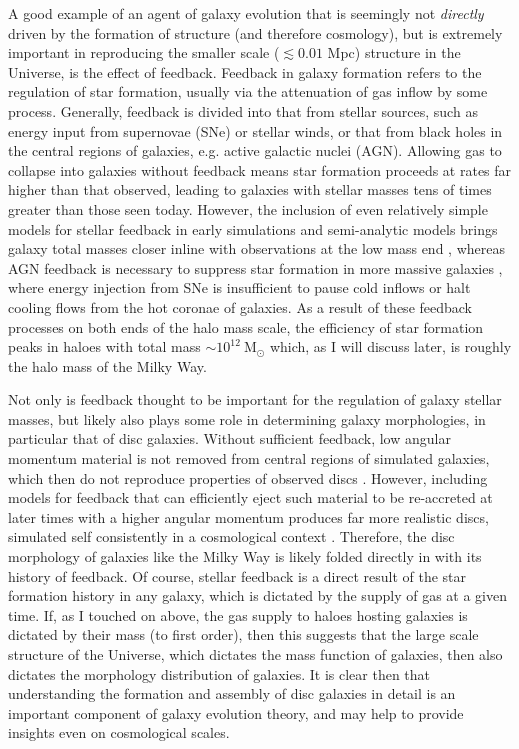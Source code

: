A good example of an agent of galaxy evolution that is seemingly not \emph{directly} driven by the formation of structure (and therefore cosmology), but is extremely important in reproducing the smaller scale ($\lesssim 0.01$ Mpc) structure in the Universe, is the effect of feedback. Feedback in galaxy formation refers to the regulation of star formation, usually via the attenuation of gas inflow by some process. Generally, feedback is divided into that from stellar sources, such as energy input from supernovae (SNe) or stellar winds, or that from black holes in the central regions of galaxies, e.g. active galactic nuclei (AGN). Allowing gas to collapse into galaxies without feedback means star formation proceeds at rates far higher than that observed, leading to galaxies with stellar masses tens of times greater than those seen today. However, the inclusion of even relatively simple models for stellar feedback in early simulations and semi-analytic models brings galaxy total masses closer inline with observations at the low mass end  \citep[$M_{200}\lesssim 10^{12}\ \mathrm{M_\odot}$ e.g.][]{1996ApJS..105...19K,1999MNRAS.310.1087S,2003MNRAS.339..312S}, whereas AGN feedback is necessary to suppress star formation in more massive galaxies \citep[$M_{200}\gtrsim 10^{12}\ \mathrm{M_\odot}$][]{2006MNRAS.370..645B,2008MNRAS.391..481S}, where energy injection from SNe is insufficient to pause cold inflows or halt cooling flows from the hot coronae of galaxies. As a result of these feedback processes on both ends of the halo mass scale, the efficiency of star formation peaks in haloes with total mass $\sim 10^{12}\ \mathrm{M_\odot}$ \citep[e.g.][]{2013ApJ...770...57B} which, as I will discuss later, is roughly the halo mass of the Milky Way. 

Not only is feedback thought to be important for the regulation of galaxy stellar masses, but likely also plays some role in determining galaxy morphologies, in particular that of disc galaxies. Without sufficient feedback, low angular momentum material is not removed from central regions of simulated galaxies, which then do not reproduce properties of observed discs \citep[e.g.][and references therein]{2010MNRAS.408..812S}. However, including models for feedback that can efficiently eject such material to be re-accreted at later times with a higher angular momentum produces far more realistic discs, simulated self consistently in a cosmological context \citep[e.g.][]{2011MNRAS.415.1051B,2012MNRAS.427..379M,2013MNRAS.428..129S}. Therefore, the disc morphology of galaxies like the Milky Way is likely folded directly in with its history of feedback. Of course, stellar feedback is a direct result of the star formation history in any galaxy, which is dictated by the supply of gas at a given time. If, as I touched on above, the gas supply to haloes hosting galaxies is dictated by their mass (to first order), then this suggests that the large scale structure of the Universe, which dictates the mass function of galaxies, then also dictates the morphology distribution of galaxies. It is clear then that understanding the formation and assembly of disc galaxies in detail is an important component of galaxy evolution theory, and may help to provide insights even on cosmological scales.

